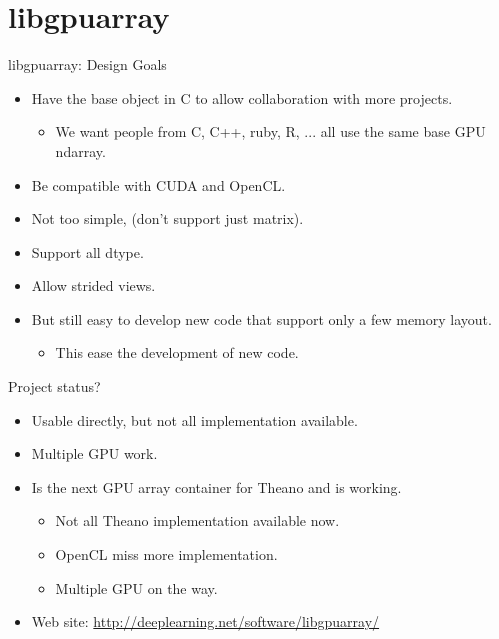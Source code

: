 \documentclass[utf8x,xcolor=pdftex,dvipsnames,table]{beamer}
\begin{document}
\section{libgpuarray}
\begin{frame}{libgpuarray: Design Goals}
  \begin{itemize}
  \item Have the base object in C to allow collaboration with more projects.
    \begin{itemize}
    \item We want people from C, C++, ruby, R, ... all use the same base GPU ndarray.
    \end{itemize}
  \item Be compatible with CUDA and OpenCL.
  \item Not too simple, (don’t support just matrix).
  \item Support all dtype.
  \item Allow strided views.
  \item But still easy to develop new code that support only a few memory layout.
    \begin{itemize}
    \item This ease the development of new code.
    \end{itemize}
  \end{itemize}
\end{frame}

\begin{frame}{Project status?}
  \begin{itemize}
  \item Usable directly, but not all implementation available.
  \item Multiple GPU work.
  \item Is the next GPU array container for Theano and is working.
    \begin{itemize}
    \item Not all Theano implementation available now.
    \item OpenCL miss more implementation.
    \item Multiple GPU on the way.
    \end{itemize}
  \item Web site: \url{http://deeplearning.net/software/libgpuarray/}
  \end{itemize}
\end{frame}
\end{document}
